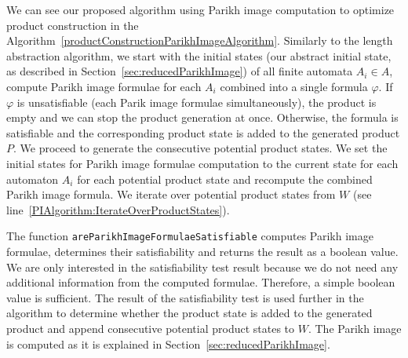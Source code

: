 We can see our proposed algorithm using Parikh image computation to optimize product construction in the Algorithm~\ref{productConstructionParikhImageAlgorithm}. Similarly to the length abstraction algorithm, we start with the initial states (our abstract initial state, as described in Section~\ref{sec:reducedParikhImage}) of all finite automata $A_i \in A$, compute Parikh image formulae for each $A_i$ combined into a single formula $\varphi$. If $\varphi$ is unsatisfiable (each Parik image formulae simultaneously), the product is empty and we can stop the product generation at once. Otherwise, the formula is satisfiable and the corresponding product state is added to the generated product $P$. We proceed to generate the consecutive potential product states. We set the initial states for Parikh image formulae computation to the current state for each automaton $A_i$ for each potential product state and recompute the combined Parikh image formula. We iterate over potential product states from $W$ (see line~\ref{PIAlgorithm:IterateOverProductStates}).

The function \texttt{areParikhImageFormulaeSatisfiable} computes Parikh image formulae, determines their satisfiability and returns the result as a boolean value. We are only interested in the satisfiability test result because we do not need any additional information from the computed formulae. Therefore, a simple boolean value is sufficient. The result of the satisfiability test is used further in the algorithm to determine whether the product state is added to the generated product and append consecutive potential product states to $W$. The Parikh image is computed as it is explained in Section~\ref{sec:reducedParikhImage}.


